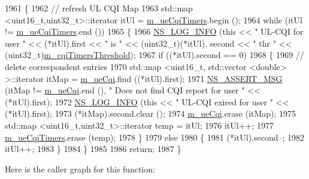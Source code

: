 \begin{DoxyCode}
1961 \{
1962   \textcolor{comment}{// refresh UL CQI  Map}
1963   std::map <uint16\_t,uint32\_t>::iterator itUl = \hyperlink{classns3_1_1TdMtFfMacScheduler_a6a60cf28e7170cd2fac6402b804827cb}{m\_ueCqiTimers}.begin ();
1964   \textcolor{keywordflow}{while} (itUl != \hyperlink{classns3_1_1TdMtFfMacScheduler_a6a60cf28e7170cd2fac6402b804827cb}{m\_ueCqiTimers}.end ())
1965     \{
1966       \hyperlink{group__logging_gafbd73ee2cf9f26b319f49086d8e860fb}{NS\_LOG\_INFO} (\textcolor{keyword}{this} << \textcolor{stringliteral}{" UL-CQI for user "} << (*itUl).first << \textcolor{stringliteral}{" is "} << (uint32\_t)(*itUl).
      second << \textcolor{stringliteral}{" thr "} << (uint32\_t)\hyperlink{classns3_1_1TdMtFfMacScheduler_a63ad2273332391bf152913fe2dbfa186}{m\_cqiTimersThreshold});
1967       \textcolor{keywordflow}{if} ((*itUl).second == 0)
1968         \{
1969           \textcolor{comment}{// delete correspondent entries}
1970           std::map <uint16\_t, std::vector <double> >::iterator itMap = \hyperlink{classns3_1_1TdMtFfMacScheduler_a586af40d969e8daa42c28b96a67b5854}{m\_ueCqi}.find ((*itUl).first);
1971           \hyperlink{assert_8h_aff5ece9066c74e681e74999856f08539}{NS\_ASSERT\_MSG} (itMap != \hyperlink{classns3_1_1TdMtFfMacScheduler_a586af40d969e8daa42c28b96a67b5854}{m\_ueCqi}.end (), \textcolor{stringliteral}{" Does not find CQI report for user "}
       << (*itUl).first);
1972           \hyperlink{group__logging_gafbd73ee2cf9f26b319f49086d8e860fb}{NS\_LOG\_INFO} (\textcolor{keyword}{this} << \textcolor{stringliteral}{" UL-CQI exired for user "} << (*itUl).first);
1973           (*itMap).second.clear ();
1974           \hyperlink{classns3_1_1TdMtFfMacScheduler_a586af40d969e8daa42c28b96a67b5854}{m\_ueCqi}.erase (itMap);
1975           std::map <uint16\_t,uint32\_t>::iterator temp = itUl;
1976           itUl++;
1977           \hyperlink{classns3_1_1TdMtFfMacScheduler_a6a60cf28e7170cd2fac6402b804827cb}{m\_ueCqiTimers}.erase (temp);
1978         \}
1979       \textcolor{keywordflow}{else}
1980         \{
1981           (*itUl).second--;
1982           itUl++;
1983         \}
1984     \}
1985 
1986   \textcolor{keywordflow}{return};
1987 \}
\end{DoxyCode}


Here is the caller graph for this function\+:


